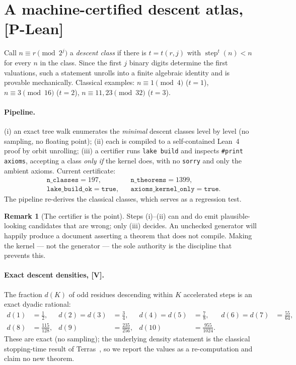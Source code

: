 \documentclass[11pt,a4paper]{article}
\theoremstyle{plain}
\theoremstyle{definition}
\newtheorem{remark}[theorem]{Remark}
\newcommand{\step}{\operatorname{step}}
\begin{document}
\section{A machine-certified descent atlas, {\bf[P-Lean]}}
Call $n\equiv r\pmod{2^j}$ a \emph{descent class} if there is $t=t(r,j)$ with
$\step^{t}(n)<n$ for every $n$ in the class. Since the first $j$ binary digits determine the
first valuations, such a statement unrolls into a finite algebraic identity and is provable
mechanically. Classical examples: $n\equiv1\pmod4$ ($t=1$), $n\equiv3\pmod{16}$ ($t=2$),
$n\equiv11,23\pmod{32}$ ($t=3$).

\paragraph{Pipeline.} (i) an exact tree walk enumerates the \emph{minimal} descent classes
level by level (no sampling, no floating point); (ii) each is compiled to a self-contained
Lean~4 proof by orbit unrolling; (iii) a certifier runs \texttt{lake build} and inspects
\texttt{\#print axioms}, accepting a class \emph{only if} the kernel does, with no
\texttt{sorry} and only the ambient axioms. Current certificate:
\[
\begin{aligned}
  &\texttt{n\_classes}=197, &&\texttt{n\_theorems}=1399,\\
  &\texttt{lake\_build\_ok}=\texttt{true}, &&\texttt{axioms\_kernel\_only}=\texttt{true}.
\end{aligned}
\]
The pipeline re-derives the classical classes, which serves as a regression test.

\begin{remark}[The certifier is the point]
Steps (i)--(ii) can and do emit plausible-looking candidates that are wrong; only (iii)
decides. An unchecked generator will happily produce a document asserting a theorem that does
not compile. Making the kernel --- not the generator --- the sole authority is the discipline
that prevents this.
\end{remark}

\paragraph{Exact descent densities, {\bf[V]}.} The fraction $d(K)$ of odd residues descending
within $K$ accelerated steps is an exact dyadic rational:
\[
\begin{aligned}
  d(1)&=\tfrac12, & d(2)=d(3)&=\tfrac34, & d(4)=d(5)&=\tfrac78, & d(6)=d(7)&=\tfrac{55}{64},\\
  d(8)&=\tfrac{115}{128}, & d(9)&=\tfrac{235}{256}, & d(10)&=\tfrac{955}{1024}. & &
\end{aligned}
\]
These are exact (no sampling); the underlying density statement is the classical stopping-time
result of Terras~\cite{terras}, so we report the values as a re-computation and claim no new
theorem.
\end{document}
